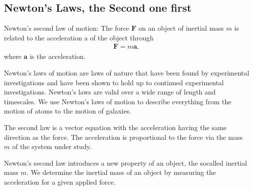 \documentclass[letterpaper,10pt,english]{sphinxmanual}
\begin{document}
\subsection{Newton’s Laws, the Second one first}
\label{\detokenize{chapter3:newton-s-laws-the-second-one-first}}
Newton’s second law of motion: The force \(\boldsymbol{F}\) on an object of inertial mass \(m\)
is related to the acceleration a of the object through
\begin{equation*}
\begin{split}
\boldsymbol{F} = m\boldsymbol{a},
\end{split}
\end{equation*}
where \(\boldsymbol{a}\) is the acceleration.

Newton’s laws of motion are laws of nature that have been found by experimental
investigations and have been shown to hold up to continued experimental investigations.
Newton’s laws are valid over a wide range of length\sphinxhyphen{} and time\sphinxhyphen{}scales. We
use Newton’s laws of motion to describe everything from the motion of atoms to the
motion of galaxies.

The second law is a vector equation with the acceleration having the same
direction as the force. The acceleration is proportional to the force via the mass \(m\) of the system under study.

Newton’s second law introduces a new property of an object, the so\sphinxhyphen{}called
inertial mass \(m\). We determine the inertial mass of an object by measuring the
acceleration for a given applied force.
\end{document}
